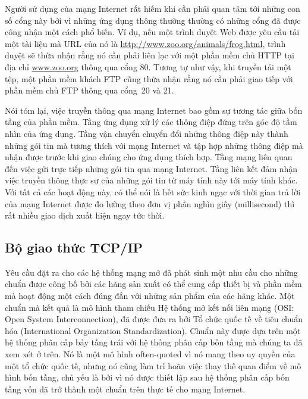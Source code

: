 Người sử dụng của mạng Internet rất hiếm khi cần phải quan tâm tới những con số cổng này
bởi vì những ứng dụng thông thường thường có những cổng đã được công nhận một cách phổ
biến. Ví dụ, nếu một trình duyệt Web được yêu cầu tải một tài liệu mà URL của nó là
\url{http://www.zoo.org/animals/frog.html}, trình duyệt sẽ thừa nhận rằng nó cần phải liên
lạc với một phần mềm chủ HTTP tại địa chỉ \url{www.zoo.org} thông qua cổng 80. Tương tự
như vậy, khi truyền tải một tệp, một phần mềm khách FTP cũng thừa nhận rằng nó cần phải
giao tiếp với phần mềm chủ FTP thông qua cổng~20 và 21.

Nói tóm lại, việc truyền thông qua mạng Internet bao gồm sự tương tác giữa bốn tầng của
phần mềm. Tầng ứng dụng xử lý các thông điệp đứng trên góc độ tầm nhìn của ứng dụng. Tầng
vận chuyển chuyển đổi những thông điệp này thành những gói tin mà tương thích với mạng
Internet và tập hợp những thông điệp mà nhận được trước khi giao chúng cho ứng dụng thích
hợp. Tầng mạng liên quan đến việc gửi trực tiếp những gói tin qua mạng Internet. Tầng liên
kết đảm nhận việc truyền thông thực sự của những gói tin từ máy tính này tới máy tính
khác. Với tất cả các hoạt động này, có thể nói là hết sức kinh ngạc với thời gian trả lời
của mạng Internet được đo lường theo đơn vị phần nghìn giây (millisecond) thì rất nhiều
giao dịch xuất hiện ngay tức thời.

\subsection*{Bộ giao thức TCP/IP}

Yêu cầu đặt ra cho các hệ thống mạng mở đã phát sinh một nhu cầu cho những chuẩn được
công bố bởi các hãng sản xuất có thể cung cấp thiết bị và phần mềm mà hoạt động một cách
đúng đắn với những sản phẩm của các hãng khác. Một chuẩn mà kết quả là mô hình tham chiếu
Hệ thống mở kết nối liên mạng (OSI: Open System Interconnection), đã được đưa ra bởi Tổ
chức quốc tế về tiêu chuẩn hóa (International Organization Standardization). Chuẩn này
được dựa trên một hệ thống phân cấp bảy tầng trái với hệ thống phân cấp bốn tầng mà chúng
ta đã xem xét ở trên. Nó là một mô hình often-quoted vì nó mang theo uy quyền của một tổ
chức quốc tế, nhưng nó cũng làm trì hoãn việc thay thế quan điểm về mô hình bốn tầng, chủ
yếu là bởi vì nó được thiết lập sau hệ thống phân cấp bốn tầng vốn đã trở thành một chuẩn
trên thực tế cho mạng Internet.


